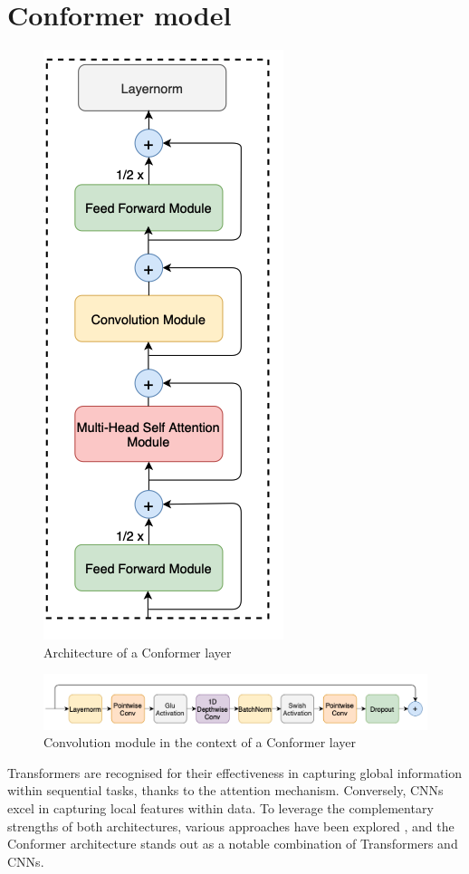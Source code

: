 \section{Conformer model}
\label{sec:Conformer}
\begin{figure}[h]
    \centering
    \includegraphics[scale=0.4]{imgs/ConformerLayer.png}
    \caption{Architecture of a Conformer layer}
    \label{fig:Conformer_archi}
\end{figure}

\begin{figure}[h]
    \centering
    \includegraphics[width=1\textwidth]{imgs/ConvolutionModule.png}
    \caption{Convolution module in the context of a Conformer layer}
    \label{fig:convModule}
\end{figure}
Transformers are recognised for their effectiveness in capturing global information within sequential tasks, thanks to the attention mechanism. Conversely, \acp{CNN} excel in capturing local features within data. To leverage the complementary strengths of both architectures, various approaches have been explored \cite{bello2019attention,yang2019convolutional}, and the Conformer architecture \cite{gulati2020conformer} stands out as a notable combination of Transformers and \acp{CNN}.

